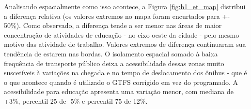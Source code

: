 \documentclass[        
    a4paper,          %
    12pt,             %
    chapter=TITLE,    %
    section=Title,    %
    subsection=Title, %
    oneside,          %
    english,          %
    spanish,          %
    brazil,           %
    fleqn             %
]{abntex2}
\begin{document}
  \begin{figure}[!h]
  \captionsetup{width=16cm}
  \centering
  \end{figure}
  
  Analisando espacialmente como isso acontece, a Figura \ref{fig:h1_et_map} distribui a diferença relativa (os valores extremos no mapa foram encurtados para +- 50\%). Como observado, a diferença tende a ser menor nas áreas de maior concentração de atividades de educação - no eixo oeste da cidade - pelo mesmo motivo das atividade de trabalho. Valores extremos de diferença continuaram sua tendência de estarem nas bordas. O isolamento espacial somado à baixa frequência de transporte público deixa a acessibilidade dessas zonas muito suscetíveis à variações na chegada e no tempo de deslocamento dos ônibus - que é o que acontece quando é utilizado o GTFS corrigido em vez do programado. A acessibilidade para educação apresenta uma variação menor, com mediana de +3\%, percentil 25 de -5\% e percentil 75 de 12\%.
  
  \begin{figure}[!h]
  \captionsetup{width=16cm}
  \centering
  \end{figure}
  
\end{document}
